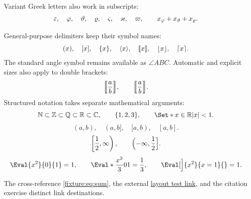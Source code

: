\documentclass[11pt,oneside]{book}
\begin{document}
Variant Greek letters also work in subscripts:
\[
  \varepsilon,\quad \varphi,\quad \vartheta,\quad \varrho,\quad
  \varsigma,\quad \varkappa,\quad \varpi,\qquad
  x_{\varphi} + x_{\vartheta} + x_{\varrho}.
\]

General-purpose delimiters keep their symbol names:
\[
  (x),\quad [x],\quad \lbrace x\rbrace,\quad
  \langle x\rangle,\quad \llbracket x\rrbracket,\quad \lfloor x\rfloor,\quad \lceil x\rceil.
\]
The standard angle symbol remains available as $\angle ABC$.
Automatic and explicit sizes also apply to double brackets:
\[
  \Dbrack*{\frac{a}{b}},\qquad \Dbrack[\Big]{\frac{a}{b}}.
\]
Structured notation takes separate mathematical arguments:
\[
  \N \subset \Z \subset \Q \subset \R \subset \C,\qquad
  \Brace{1,2,3},\qquad \Set*{x \in \R}{\Abs{x} < 1}.
\]
\[
  (a,b),\quad (a,b],\quad [a,b),\quad [a,b].
\]
\[
  \left[\frac{1}{2},\infty\right),\qquad
    \Bigl(-\infty,\frac{1}{2}\Bigr].
\]
\[
  \Eval{x^{2}}{0}{1} = 1,\qquad
  \Eval*{\frac{x^{3}}{3}}{0}{1} = \frac{1}{3},\qquad
  \Eval[\Big]{x^{2}}{x=1}{} = 1.
\]

The cross-reference \cref{fixture:eq:sum}, the external
\href{https://example.invalid/layout}{layout test link}, and the citation
\cite{layout} exercise distinct link destinations.
\printbibliography
\end{document}
